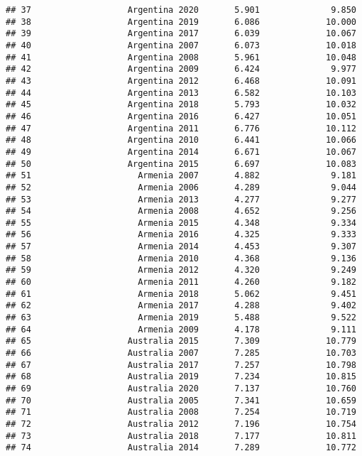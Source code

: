 \documentclass[
]{article}
\begin{document}
\begin{verbatim}
## 37                   Argentina 2020       5.901              9.850
## 38                   Argentina 2019       6.086             10.000
## 39                   Argentina 2017       6.039             10.067
## 40                   Argentina 2007       6.073             10.018
## 41                   Argentina 2008       5.961             10.048
## 42                   Argentina 2009       6.424              9.977
## 43                   Argentina 2012       6.468             10.091
## 44                   Argentina 2013       6.582             10.103
## 45                   Argentina 2018       5.793             10.032
## 46                   Argentina 2016       6.427             10.051
## 47                   Argentina 2011       6.776             10.112
## 48                   Argentina 2010       6.441             10.066
## 49                   Argentina 2014       6.671             10.067
## 50                   Argentina 2015       6.697             10.083
## 51                     Armenia 2007       4.882              9.181
## 52                     Armenia 2006       4.289              9.044
## 53                     Armenia 2013       4.277              9.277
## 54                     Armenia 2008       4.652              9.256
## 55                     Armenia 2015       4.348              9.334
## 56                     Armenia 2016       4.325              9.333
## 57                     Armenia 2014       4.453              9.307
## 58                     Armenia 2010       4.368              9.136
## 59                     Armenia 2012       4.320              9.249
## 60                     Armenia 2011       4.260              9.182
## 61                     Armenia 2018       5.062              9.451
## 62                     Armenia 2017       4.288              9.402
## 63                     Armenia 2019       5.488              9.522
## 64                     Armenia 2009       4.178              9.111
## 65                   Australia 2015       7.309             10.779
## 66                   Australia 2007       7.285             10.703
## 67                   Australia 2017       7.257             10.798
## 68                   Australia 2019       7.234             10.815
## 69                   Australia 2020       7.137             10.760
## 70                   Australia 2005       7.341             10.659
## 71                   Australia 2008       7.254             10.719
## 72                   Australia 2012       7.196             10.754
## 73                   Australia 2018       7.177             10.811
## 74                   Australia 2014       7.289             10.772

\end{verbatim}
\end{document}
